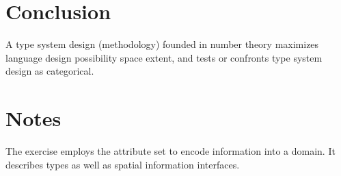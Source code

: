 \documentclass{article}
\begin{document}
\section{Conclusion}

A type system design (methodology) founded in number theory maximizes
language design possibility space extent, and tests or confronts type
system design as categorical.

\appendix

\section{Notes}

The exercise employs the attribute set to encode information into a
domain.  It describes types as well as spatial information interfaces.
\end{document}
